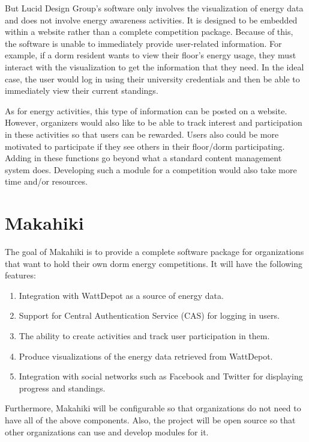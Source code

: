 But Lucid Design Group's software only involves the visualization of energy data and does not involve energy awareness activities.  It is designed to be embedded within a website rather than a complete competition package.  Because of this, the software is unable to immediately provide user-related information.  For example, if a dorm resident wants to view their floor's energy usage, they must interact with the visualization to get the information that they need.  In the ideal case, the user would log in using their university credentials and then be able to immediately view their current standings.

As for energy activities, this type of information can be posted on a website.  However, organizers would also like to be able to track interest and participation in these activities so that users can be rewarded.  Users also could be more motivated to participate if they see others in their floor/dorm participating.  Adding in these functions go beyond what a standard content management system does.  Developing such a module for a competition would also take more time and/or resources.

\section{Makahiki}

The goal of Makahiki is to provide a complete software package for organizations that want to hold their own dorm energy competitions.  It will have the following features:

\begin{enumerate}
	\item Integration with WattDepot as a source of energy data.
	\item Support for Central Authentication Service (CAS) for logging in users.
	\item The ability to create activities and track user participation in them.
	\item Produce visualizations of the energy data retrieved from WattDepot.
	\item Integration with social networks such as Facebook and Twitter for displaying progress and standings.
\end{enumerate}

Furthermore, Makahiki will be configurable so that organizations do not need to have all of the above components.  Also, the project will be open source so that other organizations can use and develop modules for it.


